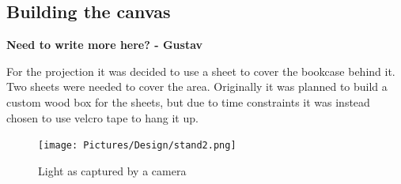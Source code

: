 \subsection{Building the canvas}
\textbf{Need to write more here? - Gustav}


For the projection it was decided to use a sheet to cover the bookcase behind it. Two sheets were needed to cover the area. Originally it was planned to build a custom wood box for the sheets, but due to time constraints it was instead chosen to use velcro tape to hang it up.
\begin{figure}[htbp] 
\centering 
\texttt{[image: Pictures/Design/stand2.png]} 
\caption{Light as captured by a camera} 
\label{fig:CanvasPosition} 
\end{figure}

